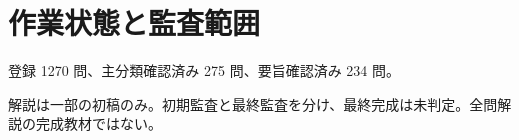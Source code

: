 \chapter{作業状態と監査範囲}
登録 1270 問、主分類確認済み 275 問、要旨確認済み 234 問。
\par 解説は一部の初稿のみ。初期監査と最終監査を分け、最終完成は未判定。全問解説の完成教材ではない。
